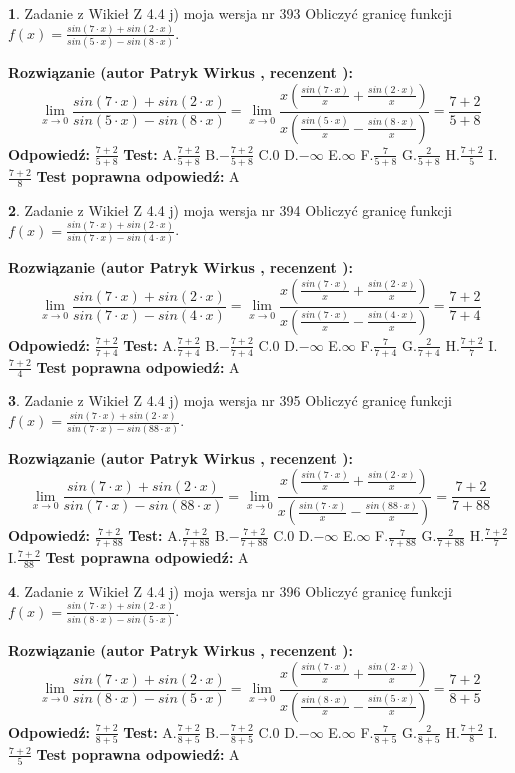 \documentclass[12pt, a4paper]{article}
\theoremstyle{definition} %
\newtheorem{zad}{}
\newcommand{\zadStart}[1]{\begin{zad}#1\newline}
\newcommand{\zadStop}{\end{zad}}
\newcommand{\rozwStart}[2]{\noindent \textbf{Rozwiązanie (autor #1 , recenzent #2): }\newline}
\newcommand{\rozwStop}{\newline}
\newcommand{\odpStart}{\noindent \textbf{Odpowiedź:}\newline}
\newcommand{\odpStop}{\newline}
\newcommand{\testStart}{\noindent \textbf{Test:}\newline}
\newcommand{\testStop}{\newline}
\newcommand{\kluczStart}{\noindent \textbf{Test poprawna odpowiedź:}\newline}
\newcommand{\kluczStop}{\newline}
\begin{document}
\zadStart{Zadanie z Wikieł Z 4.4 j) moja wersja nr 393}
Obliczyć granicę funkcji $f(x)=\frac{sin(7\cdot x) +sin(2\cdot x)}{sin(5\cdot x) -sin(8\cdot x)}$.
\zadStop
\rozwStart{Patryk Wirkus}{}
$$\lim\limits_{x\to 0}\frac{sin(7\cdot x) +sin(2\cdot x)}{sin(5\cdot x) -sin(8\cdot x)}=\lim\limits_{x\to 0}\frac{x(\frac{sin(7\cdot x)}{x}+\frac{sin(2\cdot x)}{x})}{x(\frac{sin(5\cdot x)}{x}-\frac{sin(8\cdot x)}{x})}=\frac{7+2}{5+8}$$
\rozwStop
\odpStart
$\frac{7+2}{5+8}$
\odpStop
\testStart
A.$\frac{7+2}{5+8}$
B.$-\frac{7+2}{5+8}$
C.$0$
D.$-\infty$
E.$\infty$
F.$\frac{7}{5+8}$
G.$\frac{2}{5+8}$
H.$\frac{7+2}{5}$
I.$\frac{7+2}{8}$
\testStop
\kluczStart
A
\kluczStop



\zadStart{Zadanie z Wikieł Z 4.4 j) moja wersja nr 394}
Obliczyć granicę funkcji $f(x)=\frac{sin(7\cdot x) +sin(2\cdot x)}{sin(7\cdot x) -sin(4\cdot x)}$.
\zadStop
\rozwStart{Patryk Wirkus}{}
$$\lim\limits_{x\to 0}\frac{sin(7\cdot x) +sin(2\cdot x)}{sin(7\cdot x) -sin(4\cdot x)}=\lim\limits_{x\to 0}\frac{x(\frac{sin(7\cdot x)}{x}+\frac{sin(2\cdot x)}{x})}{x(\frac{sin(7\cdot x)}{x}-\frac{sin(4\cdot x)}{x})}=\frac{7+2}{7+4}$$
\rozwStop
\odpStart
$\frac{7+2}{7+4}$
\odpStop
\testStart
A.$\frac{7+2}{7+4}$
B.$-\frac{7+2}{7+4}$
C.$0$
D.$-\infty$
E.$\infty$
F.$\frac{7}{7+4}$
G.$\frac{2}{7+4}$
H.$\frac{7+2}{7}$
I.$\frac{7+2}{4}$
\testStop
\kluczStart
A
\kluczStop



\zadStart{Zadanie z Wikieł Z 4.4 j) moja wersja nr 395}
Obliczyć granicę funkcji $f(x)=\frac{sin(7\cdot x) +sin(2\cdot x)}{sin(7\cdot x) -sin(88\cdot x)}$.
\zadStop
\rozwStart{Patryk Wirkus}{}
$$\lim\limits_{x\to 0}\frac{sin(7\cdot x) +sin(2\cdot x)}{sin(7\cdot x) -sin(88\cdot x)}=\lim\limits_{x\to 0}\frac{x(\frac{sin(7\cdot x)}{x}+\frac{sin(2\cdot x)}{x})}{x(\frac{sin(7\cdot x)}{x}-\frac{sin(88\cdot x)}{x})}=\frac{7+2}{7+88}$$
\rozwStop
\odpStart
$\frac{7+2}{7+88}$
\odpStop
\testStart
A.$\frac{7+2}{7+88}$
B.$-\frac{7+2}{7+88}$
C.$0$
D.$-\infty$
E.$\infty$
F.$\frac{7}{7+88}$
G.$\frac{2}{7+88}$
H.$\frac{7+2}{7}$
I.$\frac{7+2}{88}$
\testStop
\kluczStart
A
\kluczStop



\zadStart{Zadanie z Wikieł Z 4.4 j) moja wersja nr 396}
Obliczyć granicę funkcji $f(x)=\frac{sin(7\cdot x) +sin(2\cdot x)}{sin(8\cdot x) -sin(5\cdot x)}$.
\zadStop
\rozwStart{Patryk Wirkus}{}
$$\lim\limits_{x\to 0}\frac{sin(7\cdot x) +sin(2\cdot x)}{sin(8\cdot x) -sin(5\cdot x)}=\lim\limits_{x\to 0}\frac{x(\frac{sin(7\cdot x)}{x}+\frac{sin(2\cdot x)}{x})}{x(\frac{sin(8\cdot x)}{x}-\frac{sin(5\cdot x)}{x})}=\frac{7+2}{8+5}$$
\rozwStop
\odpStart
$\frac{7+2}{8+5}$
\odpStop
\testStart
A.$\frac{7+2}{8+5}$
B.$-\frac{7+2}{8+5}$
C.$0$
D.$-\infty$
E.$\infty$
F.$\frac{7}{8+5}$
G.$\frac{2}{8+5}$
H.$\frac{7+2}{8}$
I.$\frac{7+2}{5}$
\testStop
\kluczStart
A
\kluczStop
\end{document}
